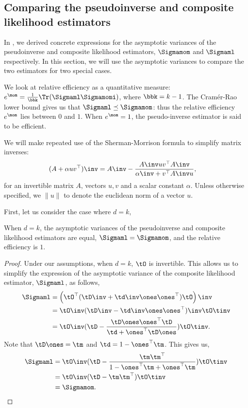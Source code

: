 \subsection{Comparing the pseudoinverse and composite likelihood estimators}
\label{app:rel-eff}

In , we derived concrete expressions for the
asymptotic variances of the pseudoinverse and composite likelihood
estimators, $\Sigmamom$ and $\Sigmaml$ respectively. 
In this section, we will use the asymptotic variances to compare the two
estimators for two special cases.

We look at relative efficiency as a quantitative measure: $e^\mom
= \frac{1}{\bbk} \Tr(\Sigmaml \Sigmamomi)$, where $\bbk = k-1$. The
Cram\'{e}r-Rao lower bound gives us that $\Sigmaml \preceq \Sigmamom$:
thus the relative efficiency $e^\mom$ lies between $0$ and $1$. When
$e^\mom = 1$, the pseudo-inverse estimator is said to be efficient.

We will make repeated use of the Sherman-Morrison formula to simplify
matrix inverses:
\begin{align*}
  (A + \alpha uv^\top)\inv &= A\inv - \frac{A\inv uv^\top A\inv}{\alpha\inv + v^\top A\inv u},
\end{align*}
for an invertible matrix $A$, vectors $u, v$ and a scalar constant
$\alpha$. Unless otherwise specified, we $\|u\|$ to denote the euclidean
norm of a vector $u$.

First, let us consider the case where $d = k$,
\begin{lemma}[Relative efficiency when $d = k$]
  When $d = k$, the asymptotic variances of the pseudoinverse and
  composite likelihood estimators are equal, $\Sigmaml = \Sigmamom$, and the relative efficiency
  is $1$.
\end{lemma}
\begin{proof}
Under our assumptions, when $d=k$, $\tO$ is invertible. This allows us
to simplify the expression of the asymptotic variance of the composite
likelihood estimator, $\Sigmaml$, as follows, 
\begin{align*}
    \Sigmaml 
      &= \left( \tO^\top(\tD\inv + \td\inv \ones \ones^\top) \tO \right)\inv \\
      &= \tO\inv (\tD\inv - \td\inv \ones \ones^\top)\inv \tO\tinv \\
      &= \tO\inv (\tD - \frac{\tD \ones \ones^\top \tD}{\td + \ones^\top \tD \ones}) \tO\tinv.
\end{align*}
Note that $\tD \ones = \tm$ and $\td = 1 - \ones^\top \tm$. This gives us,
\begin{align*}
    \Sigmaml 
      &= \tO\inv (\tD - \frac{\tm \tm^\top}{1 - \ones^\top \tm + \ones^\top \tm}) \tO\tinv \\
      &= \tO\inv (\tD - \tm \tm^\top) \tO\tinv \\
      &= \Sigmamom.
\end{align*}
\end{proof}

